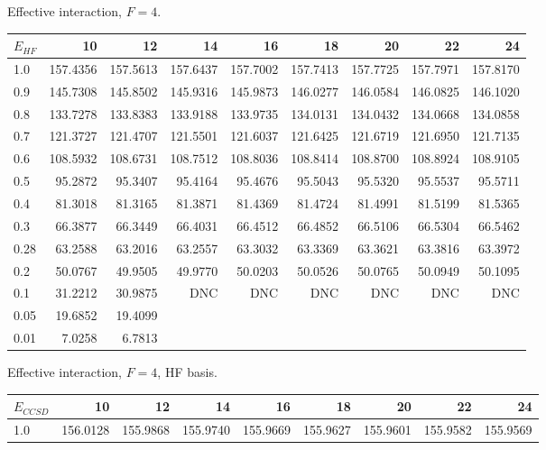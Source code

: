 \begin{landscape}
\begin{table}
\begin{center}
Effective interaction, $F=4$.\\
\begin{tabular}{l|rrrrrrrr}
\hline 
$E_{HF}$ & 10 & 12 & 14 & 16 & 18 & 20 & 22 & 24 \\
\hline \hline
1.0 &  157.4356 & 157.5613 & 157.6437 & 157.7002 & 157.7413 & 157.7725 & 157.7971 & 157.8170 \\ 
0.9 &  145.7308 & 145.8502 & 145.9316 & 145.9873 & 146.0277 & 146.0584 & 146.0825 & 146.1020 \\ 
0.8 &  133.7278 & 133.8383 & 133.9188 & 133.9735 & 134.0131 & 134.0432 & 134.0668 & 134.0858 \\ 
0.7 &  121.3727 & 121.4707 & 121.5501 & 121.6037 & 121.6425 & 121.6719 & 121.6950 & 121.7135 \\ 
0.6 &  108.5932 & 108.6731 & 108.7512 & 108.8036 & 108.8414 & 108.8700 & 108.8924 & 108.9105 \\ 
0.5 &   95.2872 &  95.3407 &  95.4164 &  95.4676 &  95.5043 &  95.5320 &  95.5537 &  95.5711 \\ 
0.4 &   81.3018 &  81.3165 &  81.3871 &  81.4369 &  81.4724 &  81.4991 &  81.5199 &  81.5365 \\ 
0.3 &   66.3877 &  66.3449 &  66.4031 &  66.4512 &  66.4852 &  66.5106 &  66.5304 &  66.5462 \\ 
0.28 &  63.2588 &  63.2016 &  63.2557 &  63.3032 &  63.3369 &  63.3621 &  63.3816 &  63.3972 \\ 
0.2 &   50.0767 &  49.9505 &  49.9770 &  50.0203 &  50.0526 &  50.0765 &  50.0949 &  50.1095 \\ 
0.1 &   31.2212 &  30.9875 &      DNC &      DNC &      DNC &      DNC &      DNC &      DNC \\ 
0.05 &  19.6852 &  19.4099  \\ 
0.01 &   7.0258 &   6.7813  \\ 
\hline \hline
\end{tabular}
\end{center}
\begin{center}
Effective interaction, $F=4$, HF basis.\\
\begin{tabular}{l|rrrrrrrr}
\hline 
$E_{CCSD}$ & 10 & 12 & 14 & 16 & 18 & 20 & 22 & 24 \\
\hline \hline
1.0 &  156.0128 & 155.9868 & 155.9740 & 155.9669 & 155.9627 & 155.9601 & 155.9582 & 155.9569 \\ 

\end{tabular}
\end{center}
\end{table}
\end{landscape}
